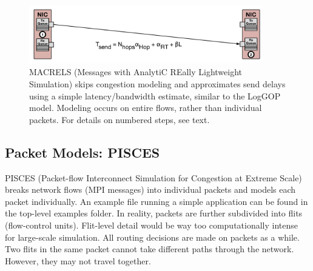 \begin{figure}
\centering
\includegraphics[width=0.9\textwidth]{figures/macrels.png}
\caption{MACRELS (Messages with AnalytiC REally Lightweight Simulation) skips congestion modeling and approximates send delays using a simple latency/bandwidth estimate, similar to the LogGOP model. Modeling occurs on entire flows, rather than individual packets. For details on numbered steps, see text.}
\label{fig:macrelsOverview}
\end{figure}


\subsection{Packet Models: PISCES}
\label{subsec:tutorial:pisces}

PISCES (Packet-flow Interconnect Simulation for Congestion at Extreme Scale) breaks network flows (MPI messages) into individual packets and models each packet individually.
An example file running a simple application can be found in the top-level examples folder.
In reality, packets are further subdivided into flits (flow-control units).
Flit-level detail would be way too computationally intense for large-scale simulation.
All routing decisions are made on packets as a while. 
Two flits in the same packet cannot take different paths through the network.
However, they may not travel together.


